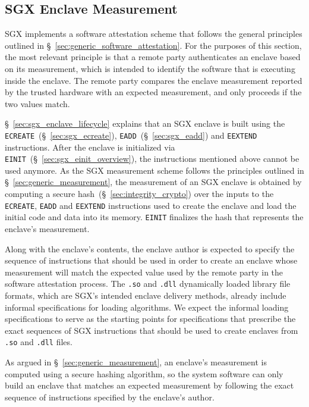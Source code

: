 \subsection{SGX Enclave Measurement}
\label{sec:sgx_measurement}
\label{sec:sgx_mrenclave}

SGX implements a software attestation scheme that follows the general
principles outlined in \S~\ref{sec:generic_software_attestation}. For the
purposes of this section, the most relevant principle is that a remote party
authenticates an enclave based on its measurement, which is intended to
identify the software that is executing inside the enclave. The remote party
compares the enclave measurement reported by the trusted hardware with an
expected measurement, and only proceeds if the two values match.


\S~\ref{sec:sgx_enclave_lifecycle} explains that an SGX enclave is built using
the \texttt{ECREATE}~(\S~\ref{sec:sgx_ecreate}),
\texttt{EADD}~(\S~\ref{sec:sgx_eadd}) and \texttt{EEXTEND} instructions.
After the enclave is initialized via
\texttt{EINIT}~(\S~\ref{sec:sgx_einit_overview}), the instructions mentioned
above cannot be used anymore. As the SGX measurement scheme follows the
principles outlined in \S~\ref{sec:generic_measurement}, the measurement of an
SGX enclave is obtained by computing a secure
hash~(\S~\ref{sec:integrity_crypto}) over the inputs to the \texttt{ECREATE},
\texttt{EADD} and \texttt{EEXTEND} instructions used to create the enclave and
load the initial code and data into its memory. \texttt{EINIT} finalizes the
hash that represents the enclave's measurement.

Along with the enclave's contents, the enclave author is expected to specify
the sequence of instructions that should be used in order to create an enclave
whose measurement will match the expected value used by the remote party in the
software attestation process. The \texttt{.so} and \texttt{.dll} dynamically
loaded library file formats, which are SGX's intended enclave delivery methods,
already include informal specifications for loading algorithms. We expect the
informal loading specifications to serve as the starting points for
specifications that prescribe the exact sequences of SGX instructions that
should be used to create enclaves from \texttt{.so} and \texttt{.dll} files.

As argued in \S~\ref{sec:generic_measurement}, an enclave's measurement is
computed using a secure hashing algorithm, so the system software can only
build an enclave that matches an expected measurement by following the exact
sequence of instructions specified by the enclave's author.

